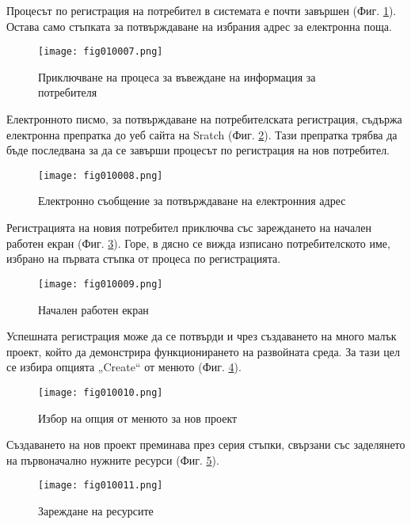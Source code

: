 Процесът по регистрация на потребител в системата е почти завършен (Фиг. \ref{fig010007}). Остава само стъпката за потвърждаване на избрания адрес за електронна поща.

\begin{figure}[H]
  \centering
  \texttt{[image: fig010007.png]}
  \caption{Приключване на процеса за въвеждане на информация за потребителя}
\label{fig010007}
\end{figure}

Електронното писмо, за потвърждаване на потребителската регистрация, съдържа електронна препратка до уеб сайта на Sratch (Фиг. \ref{fig010008}). Тази препратка трябва да бъде последвана за да се завърши процесът по регистрация на нов потребител. 

\begin{figure}[H]
  \centering
  \texttt{[image: fig010008.png]}
  \caption{Електронно съобщение за потвърждаване на електронния адрес}
\label{fig010008}
\end{figure}

Регистрацията на новия потребител приключва със зареждането на начален работен екран (Фиг. \ref{fig010009}). Горе, в дясно се вижда изписано потребителското име, избрано на първата стъпка от процеса по регистрацията.

\begin{figure}[H]
  \centering
  \texttt{[image: fig010009.png]}
  \caption{Начален работен екран}
\label{fig010009}
\end{figure}

Успешната регистрация може да се потвърди и чрез създаването на много малък проект, който да демонстрира функционирането на развойната среда. За тази цел се избира опцията „Create“ от менюто (Фиг. \ref{fig010010}).

\begin{figure}[H]
  \centering
  \texttt{[image: fig010010.png]}
  \caption{Избор на опция от менюто за нов проект}
\label{fig010010}
\end{figure}

Създаването на нов проект преминава през серия стъпки, свързани със заделянето на първоначално нужните ресурси (Фиг. \ref{fig010011}).

\begin{figure}[H]
  \centering
  \texttt{[image: fig010011.png]}
  \caption{Зареждане на ресурсите}
\label{fig010011}
\end{figure}

